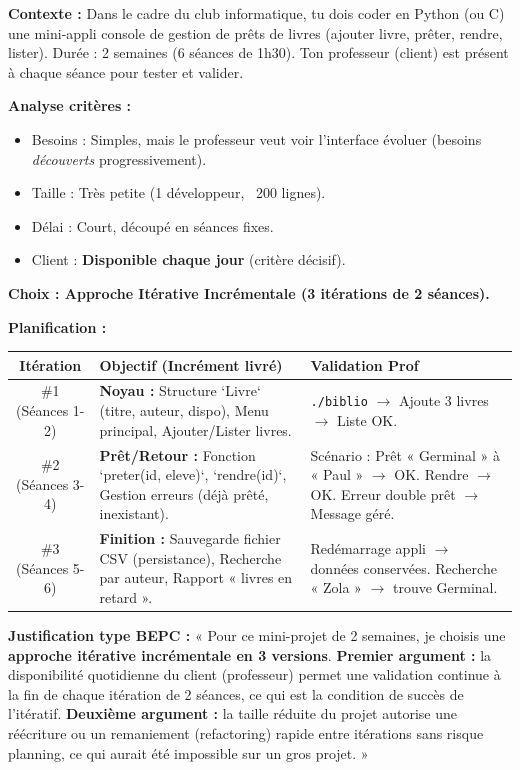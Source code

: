\documentclass[11pt]{article}
\begin{document}
\begin{exemplebox}
\textbf{Contexte :} Dans le cadre du club informatique, tu dois coder en Python (ou C) une mini-appli console de gestion de prêts de livres (ajouter livre, prêter, rendre, lister). Durée : 2 semaines (6 séances de 1h30). Ton professeur (client) est présent à chaque séance pour tester et valider.

\textbf{Analyse critères :}
\begin{itemize}
    \item Besoins : Simples, mais le professeur veut voir l'interface évoluer (besoins \emph{découverts} progressivement).
    \item Taille : Très petite (1 développeur, ~200 lignes).
    \item Délai : Court, découpé en séances fixes.
    \item Client : \textbf{Disponible chaque jour} (critère décisif).
\end{itemize}

\textbf{Choix : Approche Itérative Incrémentale (3 itérations de 2 séances).}

\textbf{Planification :}
\begin{center}
\begin{tabularx}{\linewidth}{|c|X|X|}\hline
\textbf{Itération} & \textbf{Objectif (Incrément livré)} & \textbf{Validation Prof} \\\hline
\#1 (Séances 1-2) & \textbf{Noyau :} Structure `Livre` (titre, auteur, dispo), Menu principal, Ajouter/Lister livres. & \texttt{./biblio} $\rightarrow$ Ajoute 3 livres $\rightarrow$ Liste OK. \\\hline
\#2 (Séances 3-4) & \textbf{Prêt/Retour :} Fonction `preter(id, eleve)`, `rendre(id)`, Gestion erreurs (déjà prêté, inexistant). & Scénario : Prêt « Germinal » à « Paul » $\rightarrow$ OK. Rendre $\rightarrow$ OK. Erreur double prêt $\rightarrow$ Message géré. \\\hline
\#3 (Séances 5-6) & \textbf{Finition :} Sauvegarde fichier CSV (persistance), Recherche par auteur, Rapport « livres en retard ». & Redémarrage appli $\rightarrow$ données conservées. Recherche « Zola » $\rightarrow$ trouve Germinal. \\\hline
\end{tabularx}
\end{center}

\textbf{Justification type BEPC :} « Pour ce mini-projet de 2 semaines, je choisis une \textbf{approche itérative incrémentale en 3 versions}. \textbf{Premier argument :} la disponibilité quotidienne du client (professeur) permet une validation continue à la fin de chaque itération de 2 séances, ce qui est la condition de succès de l'itératif. \textbf{Deuxième argument :} la taille réduite du projet autorise une réécriture ou un remaniement (refactoring) rapide entre itérations sans risque planning, ce qui aurait été impossible sur un gros projet. »
\end{exemplebox}
\end{document}
